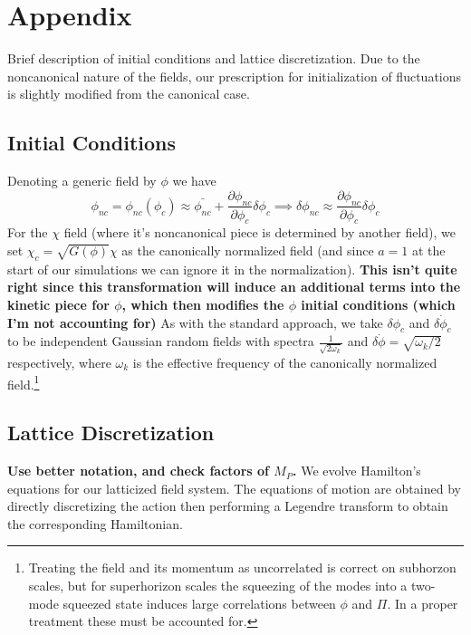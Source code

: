 \documentclass[a4paper,11pt]{article}
\begin{document}
\section{Appendix}
Brief description of initial conditions and lattice discretization.
Due to the noncanonical nature of the fields, our prescription for initialization of fluctuations is slightly modified from the canonical case.
\subsection{Initial Conditions}
Denoting a generic field by $\phi$ we have
\begin{equation}
  \phi_{nc} = \phi_{nc}(\phi_{c}) \approx \bar{\phi_{nc}} + \frac{\partial\phi_{nc}}{\partial\phi_{c}}\delta\phi_{c} \implies \delta\phi_{nc} \approx \frac{\partial\phi_{nc}}{\partial\phi_{c}}\delta\phi_{c}
\end{equation}
For the $\chi$ field (where it's noncanonical piece is determined by another field), we set $\chi_c = \sqrt{G(\phi)}\chi$ as the canonically normalized field (and since $a=1$ at the start of our simulations we can ignore it in the normalization).
{\bf This isn't quite right since this transformation will induce an additional terms into the kinetic piece for $\phi$, which then modifies the $\phi$ initial conditions (which I'm not accounting for)}
As with the standard approach, we take $\delta\phi_{c}$ and $\delta\dot{\phi}_{c}$ to be independent Gaussian random fields with spectra $\frac{1}{\sqrt{2\omega_k}}$ and $\delta\dot{\phi} = \sqrt{\omega_k/2}$ respectively, where $\omega_k$ is the effective frequency of the canonically normalized field.\footnote{Treating the field and its momentum as uncorrelated is correct on subhorzon scales, but for superhorizon scales the squeezing of the modes into a two-mode squeezed state induces large correlations between $\phi$ and $\Pi$.  In a proper treatment these must be accounted for.}

\subsection{Lattice Discretization}
{\bf Use better notation, and check factors of $M_P$.}
We evolve Hamilton's equations for our latticized field system.
The equations of motion are obtained by directly discretizing the action then performing a Legendre transform to obtain the corresponding Hamiltonian.
\end{document}
